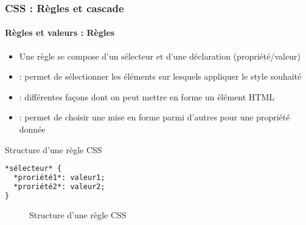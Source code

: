 \documentclass[xcolor=table]{beamer}
\begin{document}
\begin{frame}[fragile]
\frametitle{CSS : Règles et cascade}
\framesubtitle{Règles et valeurs : Règles}

\begin{minipage}{0.60\textwidth} 
\begin{itemize}
	\item Une règle se compose d'un sélecteur et d'une déclaration (propriété/valeur)
	\item {} : permet de sélectionner les éléments sur lesquels appliquer le style souhaité
	\item {} : différentes façons dont on peut mettre en forme un élément HTML
	\item {} : permet de choisir une mise en forme parmi d'autres pour une propriété donnée
\end{itemize}
\end{minipage}
%
\begin{minipage}{0.38\textwidth}
\begin{exampleblock}{Structure d'une règle CSS}
\lstset{escapeinside=**}
\scriptsize\bfseries
\begin{lstlisting}[language={html}]
*sélecteur* {
  *proriété1*: valeur1;
  *proriété2*: valeur2;
}
\end{lstlisting}
\end{exampleblock}
\begin{figure}
	\centering
	\caption{Structure d'une règle CSS \cite{mdn}}
\end{figure}
\end{minipage}

\end{frame}
\end{document}
